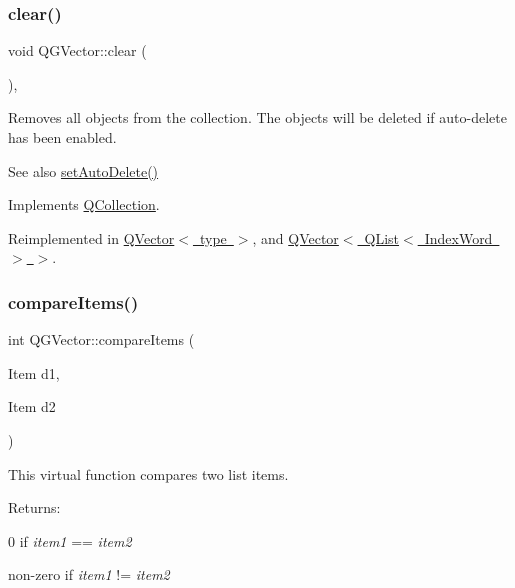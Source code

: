 \subsubsection{\texorpdfstring{clear()}{clear()}}
{\footnotesize\ttfamily void Q\+G\+Vector\+::clear (\begin{DoxyParamCaption}{ }\end{DoxyParamCaption})\hspace{0.3cm}{\ttfamily [protected]}, {\ttfamily [virtual]}}

Removes all objects from the collection. The objects will be deleted if auto-\/delete has been enabled. \begin{DoxySeeAlso}{See also}
\mbox{\hyperlink{class_q_collection_a6ed41913c76bfba54be6da26015ee3f3}{set\+Auto\+Delete()}} 
\end{DoxySeeAlso}


Implements \mbox{\hyperlink{class_q_collection_a92416cc22907550389aad04c26be2f77}{Q\+Collection}}.



Reimplemented in \mbox{\hyperlink{class_q_vector_a1d9f67e27cf360cfec05312fd014da7a}{Q\+Vector$<$ type $>$}}, and \mbox{\hyperlink{class_q_vector_a1d9f67e27cf360cfec05312fd014da7a}{Q\+Vector$<$ Q\+List$<$ Index\+Word $>$ $>$}}.

\mbox{\label{class_q_g_vector_a65a79a6de037a4033ead55891622f5e2}} 
\subsubsection{\texorpdfstring{compareItems()}{compareItems()}}
{\footnotesize\ttfamily int Q\+G\+Vector\+::compare\+Items (\begin{DoxyParamCaption}\item[{Item}]{d1,  }\item[{Item}]{d2 }\end{DoxyParamCaption})\hspace{0.3cm}{\ttfamily [virtual]}}

This virtual function compares two list items.

Returns\+: 
\begin{DoxyItemize}
\item 0 if {\itshape item1} == {\itshape item2} 
\item non-\/zero if {\itshape item1} != {\itshape item2} 
\end{DoxyItemize}

